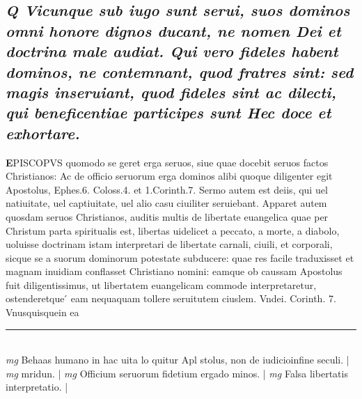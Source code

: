 \documentclass{article}
\begin{document}
\begin{pages}
\subsection*{\textit{Q Vicunque sub iugo sunt serui, suos dominos omni honore dignos ducant, ne nomen Dei et doctrina male audiat. Qui vero fideles habent dominos, ne contemnant, quod fratres sint: sed magis inseruiant, quod fideles sint ac dilecti, qui beneficentiae participes sunt Hec doce et exhortare. }}\pstart \huge\textbf{E}\normalsize PISCOPVS quomodo se geret erga seruos, siue quae docebit seruos factos Christianos: Ac de officio seruorum erga dominos alibi quoque diligenter egit Apostolus, Ephes.6. Coloss.4. et 1.Corinth.7. Sermo autem est deiis, qui uel natiuitate, uel captiuitate, uel alio casu ciuiliter seruiebant. Apparet autem quosdam seruos Christianos, auditis multis de libertate euangelica quae per Christum parta spiritualis est, libertas uidelicet a peccato, a morte, a diabolo, uoluisse doctrinam istam interpretari de libertate carnali, ciuili, et corporali, sicque se a suorum dominorum potestate subducere: quae res facile traduxisset et magnam inuidiam conflasset Christiano nomini: eamque ob caussam Apostolus fuit diligentissimus, ut libertatem euangelicam commode interpretaretur, ostenderetque ́ eam nequaquam tollere seruitutem ciuslem. Vndei. Corinth. 7. Vnusquisquein ea  \pend\pstart \huge\textbf{}\normalsize  \pend
\vspace{0.5cm}\noindent
\vspace{0.2cm}\rule{1cm}{0.2pt}\\ 
\hspace{0.2cm}\textit{mg}
\footnotesize Behaas humano in hac uita lo quitur Apl stolus, non de iudicioinfine seculi. 
\normalsize| 
\hspace{0.2cm}\textit{mg}
\footnotesize mridun. 
\normalsize| 
\hspace{0.2cm}\textit{mg}
\footnotesize Officium seruorum fidetium ergado minos. 
\normalsize| 
\hspace{0.2cm}\textit{mg}
\footnotesize Falsa libertatis interpretatio. 
\normalsize| 

\end{pages}
\end{document}
